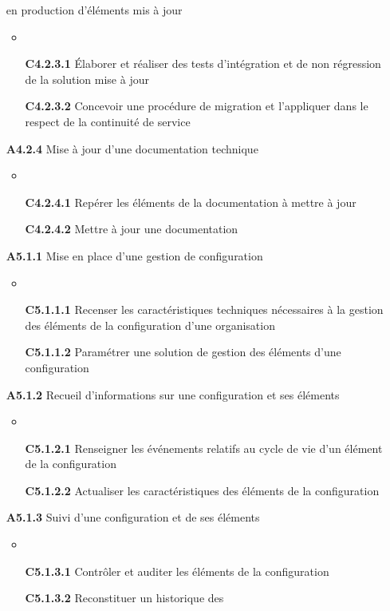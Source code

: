 \documentclass[12pt,a4paper,oneside,titlepage,final]{article}
\begin{document}
\begin{enumerate}
  en production d'éléments mis à jour
  \begin{itemize}
    \item \item [\textbf{C4.2.3.1}] Élaborer et réaliser des tests
    d'intégration et de non régression de la solution mise à jour
    \item [\textbf{C4.2.3.2}] Concevoir une procédure de migration et
    l'appliquer dans le respect de la continuité de service
  \end{itemize}
  \item [\textbf{A4.2.4}] Mise à jour d'une documentation technique
  \begin{itemize}
    \item \item [\textbf{C4.2.4.1}] Repérer les éléments de la
    documentation à mettre à jour
    \item [\textbf{C4.2.4.2}] Mettre à jour une documentation
  \end{itemize}
  \item [\textbf{A5.1.1}] Mise en place d'une gestion de configuration
  \begin{itemize}
    \item \item [\textbf{C5.1.1.1}] Recenser les caractéristiques
    techniques nécessaires à la gestion des éléments de la
    configuration d'une organisation
    \item [\textbf{C5.1.1.2}] Paramétrer une solution de gestion des
    éléments d'une configuration
  \end{itemize}
  \item [\textbf{A5.1.2}] Recueil d'informations sur une configuration
  et ses éléments
  \begin{itemize}
    \item \item [\textbf{C5.1.2.1}] Renseigner les événements relatifs
    au cycle de vie d'un élément de la configuration
    \item [\textbf{C5.1.2.2}] Actualiser les caractéristiques des
    éléments de la configuration
  \end{itemize}
  \item [\textbf{A5.1.3}] Suivi d'une configuration et de ses éléments
  \begin{itemize}
    \item \item [\textbf{C5.1.3.1}] Contrôler et auditer les éléments
    de la configuration
    \item [\textbf{C5.1.3.2}] Reconstituer un historique des

\end{itemize}
\end{enumerate}
\end{document}
